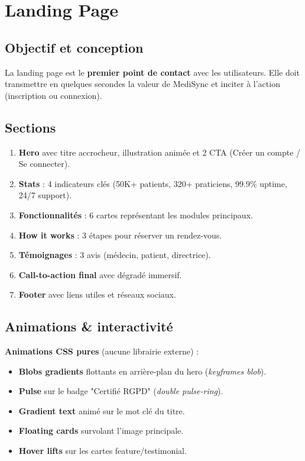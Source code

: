 \documentclass[11pt,a4paper]{article}
\begin{document}
\section{Landing Page}

\subsection{Objectif et conception}

La landing page est le \textbf{premier point de contact} avec les utilisateurs.
Elle doit transmettre en quelques secondes la valeur de MediSync et inciter
à l'action (inscription ou connexion).

\subsection{Sections}

\begin{enumerate}
  \item \textbf{Hero} avec titre accrocheur, illustration animée et 2 CTA (Créer un compte / Se connecter).
  \item \textbf{Stats} : 4 indicateurs clés (50K+ patients, 320+ praticiens, 99.9\% uptime, 24/7 support).
  \item \textbf{Fonctionnalités} : 6 cartes représentant les modules principaux.
  \item \textbf{How it works} : 3 étapes pour réserver un rendez-vous.
  \item \textbf{Témoignages} : 3 avis (médecin, patient, directrice).
  \item \textbf{Call-to-action final} avec dégradé immersif.
  \item \textbf{Footer} avec liens utiles et réseaux sociaux.
\end{enumerate}

\subsection{Animations \& interactivité}

\begin{featurebox}
\textbf{Animations CSS pures} (aucune librairie externe) :
\begin{itemize}
  \item \textbf{Blobs gradients} flottants en arrière-plan du hero (\emph{keyframes blob}).
  \item \textbf{Pulse} sur le badge "Certifié RGPD" (\emph{double pulse-ring}).
  \item \textbf{Gradient text} animé sur le mot clé du titre.
  \item \textbf{Floating cards} survolant l'image principale.
  \item \textbf{Hover lifts} sur les cartes feature/testimonial.
\end{itemize}
\end{featurebox}
\end{document}
